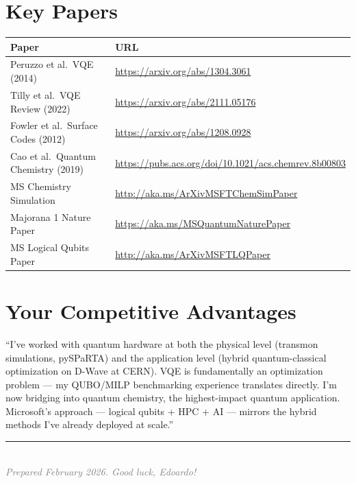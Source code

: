 \documentclass[11pt,a4paper]{article}
\begin{document}
\section*{Key Papers}
\begin{longtable}{p{6cm}p{9cm}}
\toprule
\textbf{Paper} & \textbf{URL} \\
\midrule
Peruzzo et al.\ VQE (2014) & \url{https://arxiv.org/abs/1304.3061} \\
Tilly et al.\ VQE Review (2022) & \url{https://arxiv.org/abs/2111.05176} \\
Fowler et al.\ Surface Codes (2012) & \url{https://arxiv.org/abs/1208.0928} \\
Cao et al.\ Quantum Chemistry (2019) & \url{https://pubs.acs.org/doi/10.1021/acs.chemrev.8b00803} \\
MS Chemistry Simulation & \url{http://aka.ms/ArXivMSFTChemSimPaper} \\
Majorana 1 Nature Paper & \url{https://aka.ms/MSQuantumNaturePaper} \\
MS Logical Qubits Paper & \url{http://aka.ms/ArXivMSFTLQPaper} \\
\bottomrule
\end{longtable}

\section*{Your Competitive Advantages}

\begin{importantbox}
``I've worked with quantum hardware at both the physical level (transmon simulations, pySPaRTA) and the application level (hybrid quantum-classical optimization on D-Wave at CERN). VQE is fundamentally an optimization problem --- my QUBO/MILP benchmarking experience translates directly. I'm now bridging into quantum chemistry, the highest-impact quantum application. Microsoft's approach --- logical qubits + HPC + AI --- mirrors the hybrid methods I've already deployed at scale.''
\end{importantbox}

\vfill
\begin{center}
\textcolor{gray}{\rule{0.5\textwidth}{0.5pt}}\\[0.5em]
\textcolor{gray}{\textit{Prepared February 2026. Good luck, Edoardo!}}
\end{center}
\end{document}
